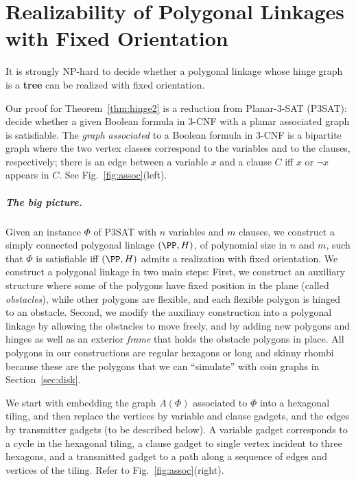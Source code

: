 
\chapter{Realizability of Polygonal Linkages with Fixed Orientation\label{sec:hinge}}

\begin{thm}\label{thm:hinge2}
It is strongly NP-hard to decide whether a polygonal linkage whose hinge graph is a \textbf{tree} can be realized with fixed orientation.
\end{thm}

Our proof for Theorem~\ref{thm:hinge2} is a reduction from {\sc Planar-3-SAT} (P3SAT): decide whether a given Boolean formula in 3-CNF with a planar associated graph is satisfiable. The \emph{graph associated} to a Boolean formula in 3-CNF is a bipartite graph where the two vertex classes correspond to the variables and to the clauses, respectively; there is an edge between a variable $x$ and a clause $C$ iff $x$ or $\neg x$ appears in $C$. See Fig.~\ref{fig:assoc}(left).



\paragraph{The big picture.}
Given an instance $\Phi$ of P3SAT with $n$ variables and $m$ clauses, we construct a simply connected polygonal linkage $(\PP,H)$, of polynomial size in $n$ and $m$, such that $\Phi$ is satisfiable iff $(\PP,H)$ admits a realization with fixed orientation. We construct a polygonal linkage  in two main steps: First, we construct an auxiliary structure where some of the polygons have fixed position in the plane (called \emph{obstacles}), while other polygons are flexible, and each flexible polygon is hinged to an obstacle. Second, we modify the auxiliary construction into a polygonal linkage by allowing the obstacles to move freely, and by adding new polygons and hinges as well as an exterior \emph{frame} that holds the obstacle polygons in place. All polygons in our constructions are regular hexagons or long and skinny rhombi because these are the polygons that we can ``simulate'' with coin graphs in Section~\ref{sec:disk}.

We start with embedding the graph $A(\Phi)$ associated to $\Phi$ into a hexagonal tiling, and then replace the vertices by variable and clause gadgets, and the edges by transmitter gadgets (to be described below). A variable gadget corresponds to a cycle in the hexagonal tiling, a clause gadget to single vertex incident to three hexagons, and a transmitted gadget to a path along a sequence of edges and vertices of the tiling. Refer to Fig.~\ref{fig:assoc}(right).

